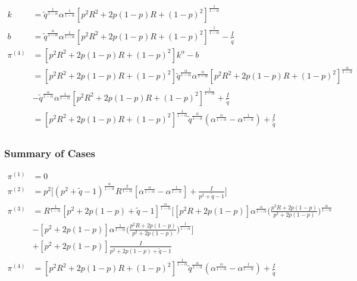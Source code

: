 \documentclass{article}
\begin{document}
\begin{itemize}
\begin{align*}
k 
&= \tilde q^{\frac{1}{1-\alpha}} \alpha^{\frac{1}{1-\alpha}}[p^2 R^2 + 2p(1-p) R  + (1-p)^2]^{\frac{1}{1-\alpha}}\\
b 
&= \tilde q^{\frac{\alpha}{1-\alpha}} \alpha^{\frac{1}{1-\alpha}}[p^2 R^2 + 2p(1-p) R  + (1-p)^2]^{\frac{1}{1-\alpha}} - \frac{I}{\tilde q}\\
\pi^{(4)} 
&= [p^2 R^2 + 2p(1-p) R  + (1-p)^2] k^\alpha - b \\
&= [p^2 R^2 + 2p(1-p) R  + (1-p)^2] \tilde q^{\frac{\alpha}{1-\alpha}} \alpha^{\frac{\alpha}{1-\alpha}}[p^2 R^2 + 2p(1-p) R  + (1-p)^2]^{\frac{\alpha}{1-\alpha}} \\&- \tilde q^{\frac{\alpha}{1-\alpha}} \alpha^{\frac{1}{1-\alpha}}[p^2 R^2 + 2p(1-p) R  + (1-p)^2]^{\frac{1}{1-\alpha}} + \frac{I}{\tilde q} \\
&= [p^2 R^2 + 2p(1-p) R  + (1-p)^2]^{\frac{1}{1-\alpha}} \tilde q^{\frac{\alpha}{1-\alpha}} (\alpha^{\frac{\alpha}{1-\alpha}} - \alpha^{\frac{1}{1-\alpha}}) + \frac{I}{\tilde q} \\
\end{align*}

\end{itemize}


\subsubsection*{Summary of Cases}

\begin{align*}
\pi^{(1)} &= 0\\
\pi^{(2)} 
&= p^2 \Bigg[ (p^2 + \tilde q  - 1)^{\frac{\alpha}{1-\alpha}}R^\frac{2}{1-\alpha} [ \alpha^{\frac{\alpha}{1-\alpha}}  - \alpha^{\frac{1}{1-\alpha}}]   + \frac{I}{p^2 + \tilde q  - 1} \Bigg]\\
\pi^{(3)} &= 
R^{\frac{1}{1-\alpha}} [p^2 + 2p(1-p) + \tilde q - 1]^{\frac{\alpha}{1-\alpha}} \Bigg[[p^2 R + 2p(1-p)  ]  \alpha^{\frac{\alpha}{1-\alpha}} \Bigg(\frac{p^2 R + 2p(1-p) }{p^2 + 2p(1-p)}\Bigg)^{\frac{\alpha}{1-\alpha}} \\&- [p^2 + 2p(1-p)] \alpha^{\frac{1}{1-\alpha}} \Bigg(\frac{p^2 R + 2p(1-p) }{p^2 + 2p(1-p)}\Bigg)^{\frac{1}{1-\alpha}} \Bigg]\\&+ [p^2 + 2p(1-p)] \frac{I}{p^2 + 2p(1-p) + \tilde q - 1}\\
\pi^{(4)} 
&= [p^2 R^2 + 2p(1-p) R  + (1-p)^2]^{\frac{1}{1-\alpha}} \tilde q^{\frac{\alpha}{1-\alpha}} (\alpha^{\frac{\alpha}{1-\alpha}} - \alpha^{\frac{1}{1-\alpha}}) + \frac{I}{\tilde q} 
\end{align*}
\end{document}
